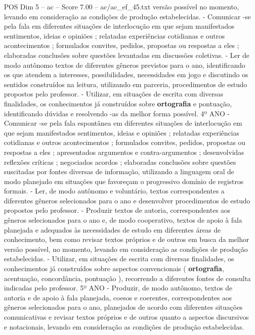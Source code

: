 \begin{textsample}{POS Dim 5 – ac – Score 7.00 – ac/ac\_ef\_45.txt}
versão possível no momento, levando em consideração as condições de produção estabelecidas. - Comunicar -se pela fala em diferentes situações de interlocução em que sejam manifestados sentimentos, ideias e opiniões ; relatadas experiências cotidianas e outros acontecimentos ; formulados convites, pedidos, propostas ou respostas a eles ; elaboradas conclusões sobre questões levantadas em discussões coletivas. - Ler de modo autônomo textos de diferentes gêneros previstos para o ano, identificando os que atendem a interesses, possibilidades, necessidades em jogo e discutindo os sentidos construídos na leitura, utilizando em parceria, procedimentos de estudo propostos pelo professor. - Utilizar, em situações de escrita com diversas finalidades, os conhecimentos já construídos sobre \textbf{ortografia} e pontuação, identificando dúvidas e resolvendo -as da melhor forma possível. 4º ANO - Comunicar -se pela fala espontânea em diferentes situações de interlocução em que sejam manifestados sentimentos, ideias e opiniões ; relatadas experiências cotidianas e outros acontecimentos ; formulados convites, pedidos, propostas ou respostas a eles ; apresentados argumentos e contra-argumentos ; desenvolvidas reflexões críticas ; negociados acordos ; elaboradas conclusões sobre questões suscitadas por fontes diversas de informação, utilizando a linguagem oral de modo planejado em situações que favoreçam o progressivo domínio de registros formais. - Ler, de modo autônomo e voluntário, textos correspondentes a diferentes gêneros selecionados para o ano e desenvolver procedimentos de estudo propostos pelo professor. - Produzir textos de autoria, correspondentes aos gêneros selecionados para o ano e, de modo cooperativo, textos de apoio à fala planejada e adequados às necessidades de estudo em diferentes áreas de conhecimento, bem como revisar textos próprios e de outros em busca da melhor versão possível, no momento, levando em consideração as condições de produção estabelecidas. - Utilizar, em situações de escrita com diversas finalidades, os conhecimentos já construídos sobre aspectos convencionais ( \textbf{ortografia}, acentuação, concordância, pontuação ), recorrendo a diferentes fontes de consulta indicadas pelo professor. 5º ANO - Produzir, de modo autônomo, textos de autoria e de apoio à fala planejada, coesos e coerentes, correspondentes aos gêneros selecionados para o ano, planejados de acordo com diferentes situações comunicativas e revisar textos próprios e de outros quanto a aspectos discursivos e notacionais, levando em consideração as condições de produção estabelecidas.

\end{textsample}
